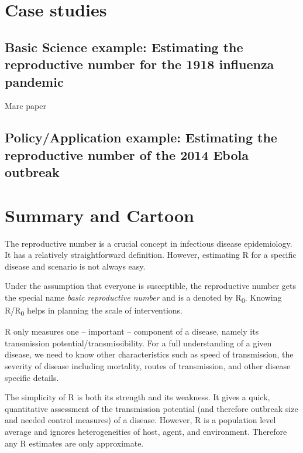 \documentclass[]{book}
\theoremstyle{definition}
\theoremstyle{definition}
\theoremstyle{definition}
\theoremstyle{remark}
\begin{document}
\hypertarget{case-studies}{%
\section{Case studies}\label{case-studies}}

\hypertarget{basic-science-example-estimating-the-reproductive-number-for-the-1918-influenza-pandemic}{%
\subsection{Basic Science example: Estimating the reproductive number
for the 1918 influenza
pandemic}\label{basic-science-example-estimating-the-reproductive-number-for-the-1918-influenza-pandemic}}

Marc paper

\hypertarget{policyapplication-example-estimating-the-reproductive-number-of-the-2014-ebola-outbreak}{%
\subsection{Policy/Application example: Estimating the reproductive
number of the 2014 Ebola
outbreak}\label{policyapplication-example-estimating-the-reproductive-number-of-the-2014-ebola-outbreak}}

\hypertarget{summary-and-cartoon-1}{%
\section{Summary and Cartoon}\label{summary-and-cartoon-1}}

The reproductive number is a crucial concept in infectious disease
epidemiology. It has a relatively straightforward definition. However,
estimating R for a specific disease and scenario is not always easy.

Under the assumption that everyone is susceptible, the reproductive
number gets the special name \emph{basic reproductive number} and is a
denoted by R\textsubscript{0}. Knowing R/R\textsubscript{0} helps in
planning the scale of interventions.

R only measures one -- important -- component of a disease, namely its
transmission potential/transmissibility. For a full understanding of a
given disease, we need to know other characteristics such as speed of
transmission, the severity of disease including mortality, routes of
transmission, and other disease specific details.

The simplicity of R is both its strength and its weakness. It gives a
quick, quantitative assessment of the transmission potential (and
therefore outbreak size and needed control measures) of a disease.
However, R is a population level average and ignores heterogeneities of
host, agent, and environment. Therefore any R estimates are only
approximate.
\end{document}
